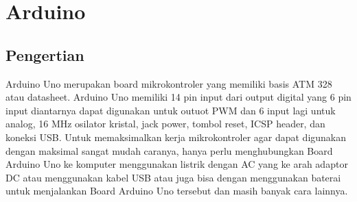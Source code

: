 \section{Arduino}
\subsection{Pengertian}
Arduino Uno merupakan board mikrokontroler yang memiliki basis ATM 328 atau datasheet. Arduino Uno memiliki 14 pin input dari output digital yang 6 pin input diantarnya dapat digunakan untuk outuot PWM dan 6 input lagi untuk analog, 16 MHz osilator kristal, jack power, tombol reset, ICSP header, dan koneksi USB. Untuk memaksimalkan kerja mikrokontroler agar dapat digunakan dengan maksimal sangat mudah caranya, hanya perlu menghubungkan Board Arduino Uno ke komputer menggunakan listrik dengan  AC yang ke arah  adaptor DC atau menggunakan kabel USB atau  juga bisa dengan menggunakan baterai untuk menjalankan Board Arduino Uno tersebut dan masih banyak cara lainnya.